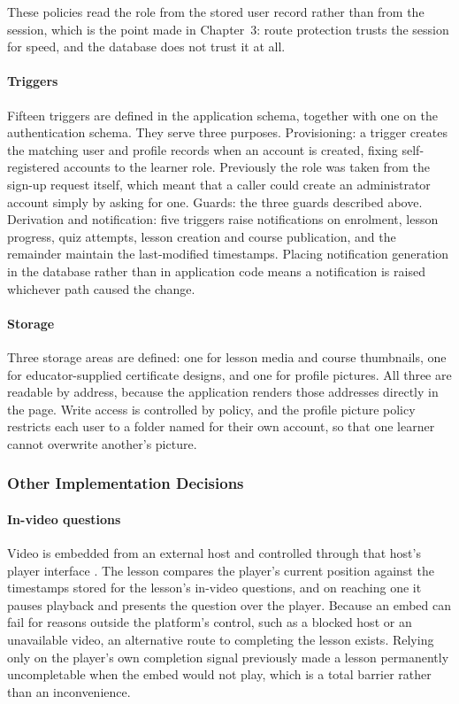 \documentclass[12pt, oneside]{article} %
\begin{document}
These policies read the role from the stored user record rather than from the session, which is the point made in Chapter~3: route protection trusts the session for speed, and the database does not trust it at all.

\paragraph{Triggers}

Fifteen triggers are defined in the application schema, together with one on the authentication schema. They serve three purposes. Provisioning: a trigger creates the matching user and profile records when an account is created, fixing self-registered accounts to the learner role. Previously the role was taken from the sign-up request itself, which meant that a caller could create an administrator account simply by asking for one. Guards: the three guards described above. Derivation and notification: five triggers raise notifications on enrolment, lesson progress, quiz attempts, lesson creation and course publication, and the remainder maintain the last-modified timestamps. Placing notification generation in the database rather than in application code means a notification is raised whichever path caused the change.

\paragraph{Storage}

Three storage areas are defined: one for lesson media and course thumbnails, one for educator-supplied certificate designs, and one for profile pictures. All three are readable by address, because the application renders those addresses directly in the page. Write access is controlled by policy, and the profile picture policy restricts each user to a folder named for their own account, so that one learner cannot overwrite another's picture.

\subsubsection{Other Implementation Decisions}

\paragraph{In-video questions}

Video is embedded from an external host and controlled through that host's player interface \cite{youtube_iframe_api}. The lesson compares the player's current position against the timestamps stored for the lesson's in-video questions, and on reaching one it pauses playback and presents the question over the player. Because an embed can fail for reasons outside the platform's control, such as a blocked host or an unavailable video, an alternative route to completing the lesson exists. Relying only on the player's own completion signal previously made a lesson permanently uncompletable when the embed would not play, which is a total barrier rather than an inconvenience.
\end{document}
